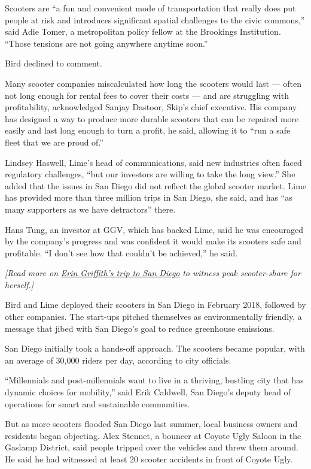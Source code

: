 Scooters are ``a fun and convenient mode of transportation that really
does put people at risk and introduces significant spatial challenges to
the civic commons,'' said Adie Tomer, a metropolitan policy fellow at
the Brookings Institution. ``Those tensions are not going anywhere
anytime soon.''

Bird declined to comment.

Many scooter companies miscalculated how long the scooters would last
--- often not long enough for rental fees to cover their costs --- and
are struggling with profitability, acknowledged Sanjay Dastoor, Skip's
chief executive. His company has designed a way to produce more durable
scooters that can be repaired more easily and last long enough to turn a
profit, he said, allowing it to ``run a safe fleet that we are proud
of.''

Lindsey Haswell, Lime's head of communications, said new industries
often faced regulatory challenges, ``but our investors are willing to
take the long view.'' She added that the issues in San Diego did not
reflect the global scooter market. Lime has provided more than three
million trips in San Diego, she said, and has ``as many supporters as we
have detractors'' there.

Hans Tung, an investor at GGV, which has backed Lime, said he was
encouraged by the company's progress and was confident it would make its
scooters safe and profitable. ``I don't see how that couldn't be
achieved,'' he said.

\emph{{[}Read more on}
\href{https://www.nytimes3xbfgragh.onion/2019/09/10/reader-center/to-cover-scooter-disruption-take-the-ride.html}{\emph{Erin
Griffith's trip to San Diego}} \emph{to witness peak scooter-share for
herself.{]}}

Bird and Lime deployed their scooters in San Diego in February 2018,
followed by other companies. The start-ups pitched themselves as
environmentally friendly, a message that jibed with San Diego's goal to
reduce greenhouse emissions.

San Diego initially took a hands-off approach. The scooters became
popular, with an average of 30,000 riders per day, according to city
officials.

``Millennials and post-millennials want to live in a thriving, bustling
city that has dynamic choices for mobility,'' said Erik Caldwell, San
Diego's deputy head of operations for smart and sustainable communities.

But as more scooters flooded San Diego last summer, local business
owners and residents began objecting. Alex Stennet, a bouncer at Coyote
Ugly Saloon in the Gaslamp District, said people tripped over the
vehicles and threw them around. He said he had witnessed at least 20
scooter accidents in front of Coyote Ugly.

